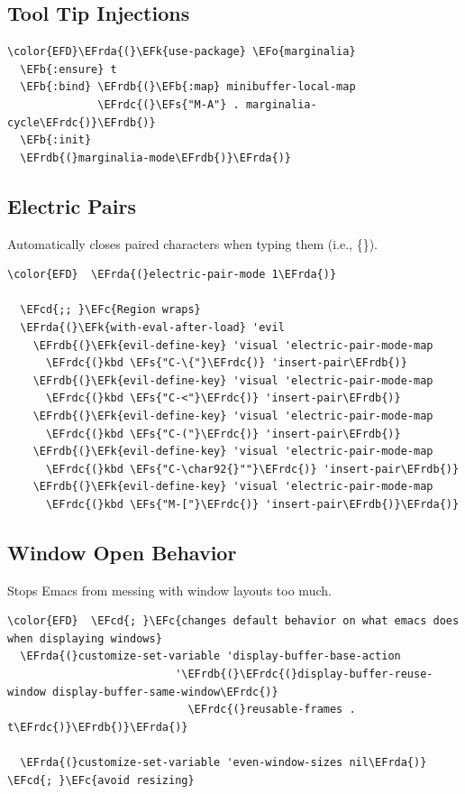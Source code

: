 \documentclass[11pt]{article}
\newcommand{\EFc}[1]{\textcolor{EFc}{#1}} %
\newcommand{\EFcd}[1]{\textcolor{EFcd}{#1}} %
\newcommand{\EFs}[1]{\textcolor{EFs}{#1}} %
\newcommand{\EFk}[1]{\textcolor{EFk}{#1}} %
\newcommand{\EFb}[1]{\textcolor{EFb}{#1}} %
\newcommand{\EFo}[1]{\textcolor{EFo}{#1}} %
\newcommand{\EFrda}[1]{\textcolor{EFrda}{#1}} %
\newcommand{\EFrdb}[1]{\textcolor{EFrdb}{#1}} %
\newcommand{\EFrdc}[1]{\textcolor{EFrdc}{#1}} %
\begin{document}
\subsection{Tool Tip Injections}
\label{sec:org4cacac5}
\begin{Code}
\begin{Verbatim}
\color{EFD}\EFrda{(}\EFk{use-package} \EFo{marginalia}
  \EFb{:ensure} t
  \EFb{:bind} \EFrdb{(}\EFb{:map} minibuffer-local-map
              \EFrdc{(}\EFs{"M-A"} . marginalia-cycle\EFrdc{)}\EFrdb{)}
  \EFb{:init}
  \EFrdb{(}marginalia-mode\EFrdb{)}\EFrda{)}
\end{Verbatim}
\end{Code}
\subsection{Electric Pairs}
\label{sec:org0775e52}
Automatically closes paired characters when typing them (i.e., \{\}).

\begin{Code}
\begin{Verbatim}
\color{EFD}  \EFrda{(}electric-pair-mode 1\EFrda{)}

  \EFcd{;; }\EFc{Region wraps}
  \EFrda{(}\EFk{with-eval-after-load} 'evil
    \EFrdb{(}\EFk{evil-define-key} 'visual 'electric-pair-mode-map
      \EFrdc{(}kbd \EFs{"C-\{"}\EFrdc{)} 'insert-pair\EFrdb{)}
    \EFrdb{(}\EFk{evil-define-key} 'visual 'electric-pair-mode-map
      \EFrdc{(}kbd \EFs{"C-<"}\EFrdc{)} 'insert-pair\EFrdb{)}
    \EFrdb{(}\EFk{evil-define-key} 'visual 'electric-pair-mode-map
      \EFrdc{(}kbd \EFs{"C-("}\EFrdc{)} 'insert-pair\EFrdb{)}
    \EFrdb{(}\EFk{evil-define-key} 'visual 'electric-pair-mode-map
      \EFrdc{(}kbd \EFs{"C-\char92{}""}\EFrdc{)} 'insert-pair\EFrdb{)}
    \EFrdb{(}\EFk{evil-define-key} 'visual 'electric-pair-mode-map
      \EFrdc{(}kbd \EFs{"M-["}\EFrdc{)} 'insert-pair\EFrdb{)}\EFrda{)}
\end{Verbatim}
\end{Code}
\subsection{Window Open Behavior}
\label{sec:org58c7362}
Stops Emacs from messing with window layouts too much.

\begin{Code}
\begin{Verbatim}
\color{EFD}  \EFcd{; }\EFc{changes default behavior on what emacs does when displaying windows}
  \EFrda{(}customize-set-variable 'display-buffer-base-action
                          '\EFrdb{(}\EFrdc{(}display-buffer-reuse-window display-buffer-same-window\EFrdc{)}
                            \EFrdc{(}reusable-frames . t\EFrdc{)}\EFrdb{)}\EFrda{)}

  \EFrda{(}customize-set-variable 'even-window-sizes nil\EFrda{)} \EFcd{; }\EFc{avoid resizing}
\end{Verbatim}
\end{Code}
\end{document}
